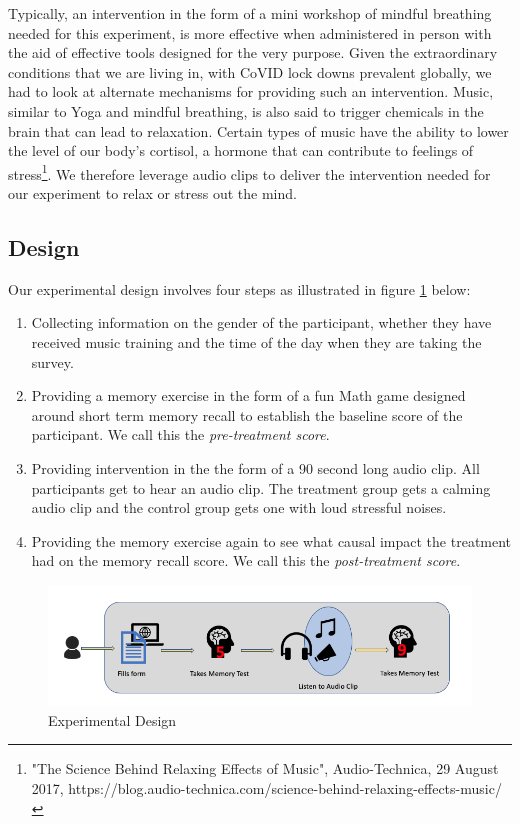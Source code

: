\documentclass[journal,onecolumn, 12pt]{article}
\begin{document}
\noindent
Typically, an intervention in the form of a mini workshop of mindful breathing  needed for this experiment, is more effective when administered in person with the aid of effective tools designed for the very purpose. Given the extraordinary conditions that we are living in, with CoVID lock downs prevalent globally, we had to look at alternate mechanisms for providing such an intervention. Music, similar to Yoga and mindful breathing, is also said to trigger chemicals in the brain that can lead to relaxation. Certain types of music have the ability to lower the level of our body's cortisol, a hormone that can contribute to feelings of stress\footnote {"The Science Behind Relaxing Effects of Music", Audio-Technica, 29 August 2017, https://blog.audio-technica.com/science-behind-relaxing-effects-music/}. We therefore leverage audio clips to deliver the intervention needed for our experiment to relax or stress out the mind.

\subsection {Design}
Our experimental design involves four steps as illustrated in figure \ref {fig: Experiment} below: 
\begin{enumerate}
    \item Collecting information on the gender of the participant, whether they have received music training and the time of the day when they are taking the survey.
    \item Providing a memory exercise in the form of a fun Math game designed around short term memory recall to establish the baseline score of the participant. We call this the \textit{pre-treatment score}.
    \item Providing intervention in the the form of a 90 second long audio clip. All participants get to hear an audio clip. The treatment group gets a calming audio clip and the control group gets one with loud stressful noises.
    \item Providing the memory exercise again to see what causal impact the treatment had on the memory recall score. We call this the \textit{post-treatment score}.
\end{enumerate} 

\begin{figure}[h]
    \centering
    \includegraphics[width=\columnwidth]{images/ExptOverview.png}
    \caption{Experimental Design}
    \label{fig: Experiment}
\end{figure}
\end{document}
